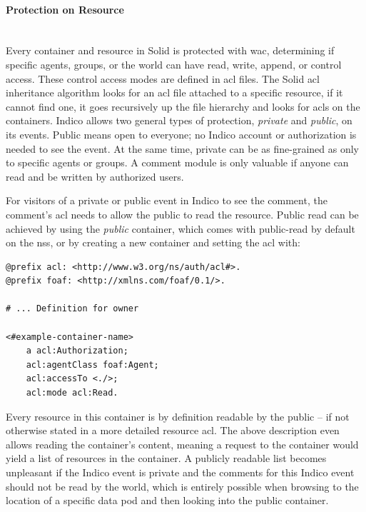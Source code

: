 \vspace{0.5cm}
\paragraph{Protection on Resource}\label{protection-on-resource}\mbox{}\\

Every container and resource in Solid is protected with \gls{wac}, determining if specific agents, groups, or the world can have read, write, append, or control access. These control access modes are defined in \gls{acl} files. The Solid \gls{acl} inheritance algorithm looks for an \gls{acl} file attached to a specific resource, if it cannot find one, it goes recursively up the file hierarchy and looks for \glspl{acl} on the containers.
Indico allows two general types of protection, \textit{private} and \textit{public}, on its events. Public means open to everyone; no Indico account or authorization is needed to see the event. At the same time, private can be as fine-grained as only to specific agents or groups. A comment module is only valuable if anyone can read and be written by authorized users.

For visitors of a private or public event in Indico to see the comment, the comment’s \gls{acl} needs to allow the public to read the resource.  Public read can be achieved by using the \textit{public} container, which comes with public-read by default on the \gls{nss}, or by creating a new container and setting the \gls{acl} with:

\begin{lstlisting}[language=Other,columns=fullflexible, caption={Setting default read for resources in container}, label={lst:container-acl}]
@prefix acl: <http://www.w3.org/ns/auth/acl#>.
@prefix foaf: <http://xmlns.com/foaf/0.1/>.

# ... Definition for owner

<#example-container-name>
    a acl:Authorization;
    acl:agentClass foaf:Agent;
    acl:accessTo <./>;
    acl:mode acl:Read.
\end{lstlisting}

Every resource in this container is by definition readable by the public -- if not otherwise stated in a more detailed resource \gls{acl}. The above description even allows reading the container’s content, meaning a request to the container would yield a list of resources in the container. A publicly readable list becomes unpleasant if the Indico event is private and the comments for this Indico event should not be read by the world, which is entirely possible when browsing to the location of a specific data pod and then looking into the public container.

